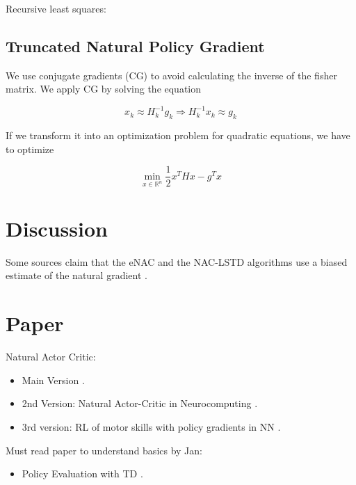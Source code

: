 	Recursive least squares: \cite{park2005rls}
	
	\subsection{Truncated Natural Policy Gradient}
	
	We use conjugate gradients (CG) to avoid calculating the inverse of the fisher matrix. We apply CG by solving the equation
	
	\begin{equation}
		x_k \approx H_k^{-1} g_k \Rightarrow H^{-1}_k x_k \approx g_k
	\end{equation}
	
	If we transform it into an optimization problem for quadratic equations, we have to optimize
	
	\begin{equation}
		\min_{x \in \mathbb{R}^n} \dfrac{1}{2} x^T H x - g^T x
	\end{equation}

\section{Discussion}

Some sources claim that the eNAC and the NAC-LSTD algorithms use a biased estimate of the natural gradient \cite{thomas2014bias}.


\newpage
\section{Paper}
Natural Actor Critic:
\begin{itemize}
	\item Main Version \cite{peters2005natural}.
	\item 2nd Version: Natural Actor-Critic in Neurocomputing \cite{peters2008natural}.
	\item 3rd version: RL of motor skills with policy gradients in NN \cite{peters2008reinforcement}.
\end{itemize}

\noindent Must read paper to understand basics by Jan:
\begin{itemize}
	\item Policy Evaluation with TD \cite{dann2014policy}.
\end{itemize}


